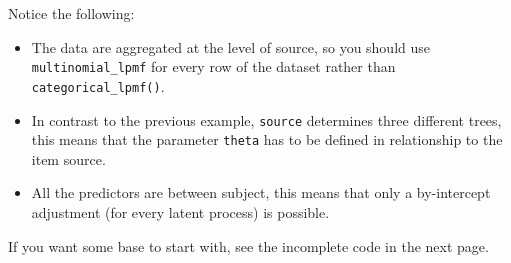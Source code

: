 \documentclass[12pt,]{krantz}
\providecommand{\tightlist}{%
  \setlength{\itemsep}{0pt}\setlength{\parskip}{0pt}}
\theoremstyle{definition}
\theoremstyle{definition}
\theoremstyle{definition}
\theoremstyle{remark}
\begin{document}
Notice the following:

\begin{itemize}
\tightlist
\item
  The data are aggregated at the level of source, so you should use \texttt{multinomial\_lpmf} for every row of the dataset rather than \texttt{categorical\_lpmf()}.
\item
  In contrast to the previous example, \texttt{source} determines three different trees, this means that the parameter \texttt{theta} has to be defined in relationship to the item source.
\item
  All the predictors are between subject, this means that only a by-intercept adjustment (for every latent process) is possible.
\end{itemize}

If you want some base to start with, see the incomplete code in the next page.

\newpage
\end{document}
